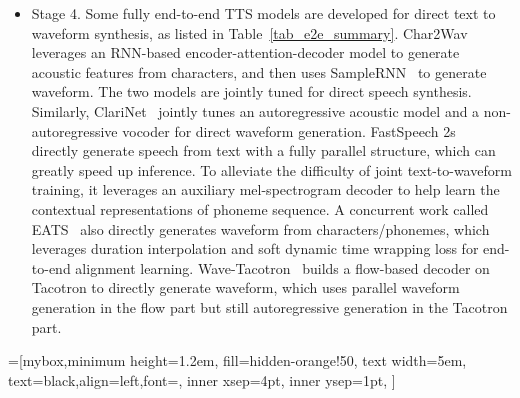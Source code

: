 \documentclass{article}
\begin{document}
\begin{itemize}[leftmargin=*]
    \item Stage 4. Some fully end-to-end TTS models are developed for direct text to waveform synthesis, as listed in Table~\ref{tab_e2e_summary}. Char2Wav~\cite{sotelo2017char2wav} leverages an RNN-based encoder-attention-decoder model to generate acoustic features from characters, and then uses SampleRNN~\cite{mehri2016samplernn} to generate waveform. The two models are jointly tuned for direct speech synthesis. Similarly, ClariNet~\cite{ping2018clarinet} jointly tunes an autoregressive acoustic model and a non-autoregressive vocoder for direct waveform generation. FastSpeech 2s~\cite{ren2021fastspeech} directly generate speech from text with a fully parallel structure, which can greatly speed up inference. To alleviate the difficulty of joint text-to-waveform training, it leverages an auxiliary mel-spectrogram decoder to help learn the contextual representations of phoneme sequence. A concurrent work called EATS~\cite{donahue2020end} also directly generates waveform from characters/phonemes, which leverages duration interpolation and soft dynamic time wrapping loss for end-to-end alignment learning. Wave-Tacotron~\cite{weiss2020wave} builds a flow-based decoder on Tacotron to directly generate waveform, which uses parallel waveform generation in the flow part but still autoregressive generation in the Tacotron part. 
\end{itemize}


=[mybox,minimum height=1.2em,
fill=hidden-orange!50, text width=5em,  text=black,align=left,font=\footnotesize,
inner xsep=4pt,
inner ysep=1pt,
]
\end{document}
